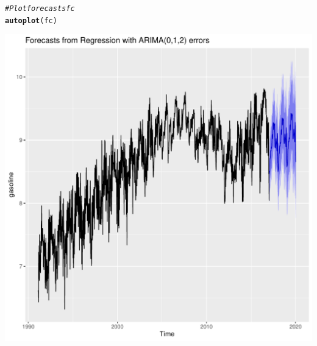 \documentclass{article}\usepackage[]{graphicx}\usepackage[]{color}
\makeatletter
\def\maxwidth{ %
  \ifdim\Gin@nat@width>\linewidth
    \linewidth
  \else
    \Gin@nat@width
  \fi
}
\newcommand{\hlcom}[1]{\textcolor[rgb]{0.678,0.584,0.686}{\textit{#1}}}%
\newcommand{\hlstd}[1]{\textcolor[rgb]{0.345,0.345,0.345}{#1}}%
\newcommand{\hlkwd}[1]{\textcolor[rgb]{0.737,0.353,0.396}{\textbf{#1}}}%
\newenvironment{kframe}{%
 \def\at@end@of@kframe{}%
 \ifinner\ifhmode%
  \def\at@end@of@kframe{\end{minipage}}%
  \begin{minipage}{\columnwidth}%
 \fi\fi%
 \def\FrameCommand##1{\hskip\@totalleftmargin \hskip-\fboxsep
 \colorbox{shadecolor}{##1}\hskip-\fboxsep
     \hskip-\linewidth \hskip-\@totalleftmargin \hskip\columnwidth}%
 \MakeFramed {\advance\hsize-\width
   \@totalleftmargin\z@ \linewidth\hsize
   \@setminipage}}%
 {\par\unskip\endMakeFramed%
 \at@end@of@kframe}
\newenvironment{knitrout}{}{} %
\makeatother
\begin{document}
\begin{itemize}
\begin{itemize}
\begin{knitrout}
\begin{kframe}
\begin{alltt}
\hlcom{# Plot forecasts fc}
\hlkwd{autoplot}\hlstd{(fc)}
\end{alltt}
\end{kframe}
\includegraphics[width=\maxwidth]{figure/unnamed-chunk-3-1} 

\end{knitrout}


\end{itemize}
\end{itemize}
\end{document}
